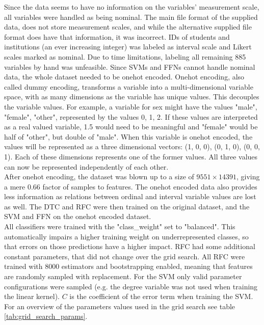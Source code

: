 Since the data seems to have no information on the variables' measurement scale, all variables were handled as being nominal. The main file format of the supplied data, does not store measurement scales, and while the alternative supplied file format does have that information, it was incorrect. IDs of students and institutions (an ever increasing integer) was labeled as interval scale and Likert scales marked as nominal. Due to time limitations, labeling all remaining 885 variables by hand was unfeasible. Since SVMs and FFNs cannot handle nominal data, the whole dataset needed to be onehot encoded. Onehot encoding, also called dummy encoding, transforms a variable into a multi-dimensional variable space, with as many dimensions as the variable has unique values. This decouples the variable values. For example, a variable for sex might have the values "male", "female", "other", represented by the values 0, 1, 2. If these values are interpreted as a real valued variable, 1.5 would need to be meaningful and "female" would be half of "other", but double of "male". When this variable is onehot encoded, the values will be represented as a three dimensional vectors: (1, 0, 0), (0, 1, 0), (0, 0, 1). Each of these dimensions represents one of the former values. All three values can now be represented independently of  each other.\\
After onehot encoding, the dataset was blown up to a size of $9551 \times 14391$, giving a mere 0.66 factor of samples to features. The onehot encoded data also provides less information as relations between ordinal and interval variable values are lost as well. The DTC and RFC were then trained on the original dataset, and the SVM and FFN on the onehot encoded dataset.\\
All classifiers were trained with the "class\_weight" set to "balanced". This automatically impairs a higher training weight on underrepresented classes, so that errors on those predictions have a higher impact. RFC had some additional constant parameters, that did not change over the grid search. All RFC were trained with 8000 estimators and bootstrapping enabled, meaning that features are randomly sampled with replacement. For the SVM only valid parameter configurations were sampled (e.g. the degree variable was not used when training the linear kernel). $C$ is the coefficient of the error term when training the SVM. For an overview of the parameters values used in the grid search see table \ref{tab:grid_search_params}.
